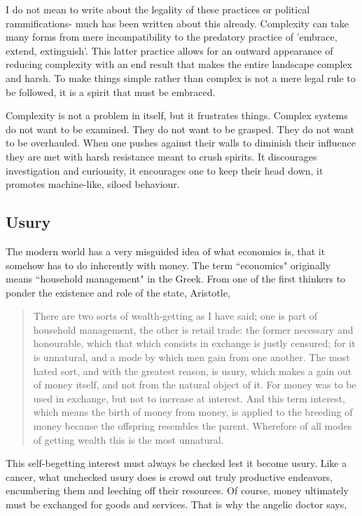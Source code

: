 \documentclass[letterpaper]{article}
\begin{document}

I do not mean to write about the legality of these practices or political rammifications- much has been written about this already. Complexity can take many forms from mere incompatibility to the predatory practice of 'embrace, extend, extinguish'. This latter practice allows for an outward appearance of reducing complexity with an end result that makes the entire landscape complex and harsh. To make things simple rather than complex is not a mere legal rule to be followed, it is a spirit that must be embraced.

Complexity is not a problem in itself, but it frustrates things. Complex systems do not want to be examined. They do not want to be grasped. They do not want to be overhauled. When one pushes against their walls to diminish their influence they are met with harsh resistance meant to crush spirits. It discourages investigation and curiousity, it encourages one to keep their head down, it promotes machine-like, siloed behaviour.
\fi

\subsection{Usury}

The modern world has a very misguided idea of what economics is, that it somehow has to do inherently with money. The term ``economics" originally means ``household management" in the Greek. From one of the first thinkers to ponder the existence and role of the state, Aristotle,

\begin{quote}
  There are two sorts of wealth-getting as I have said; one is part of household management, the other is retail trade: the former necessary and honourable, which that which consists in exchange is justly censured; for it is unnatural, and a mode by which men gain from one another. The most hated sort, and with the greatest reason, is usury, which makes a gain out of money itself, and not from the natural object of it. For money was to be used in exchange, but not to increase at interest. And this term interest, which means the birth of money from money, is applied to the breeding of money because the offspring resembles the parent. Wherefore of all modes of getting wealth this is the most unnatural.
\end{quote}

This self-begetting interest must always be checked lest it become usury. Like a cancer, what unchecked usury does is crowd out truly productive endeavors, encumbering them and leeching off their resources. Of course, money ultimately must be exchanged for goods and services. That is why the angelic doctor says,
\end{document}
